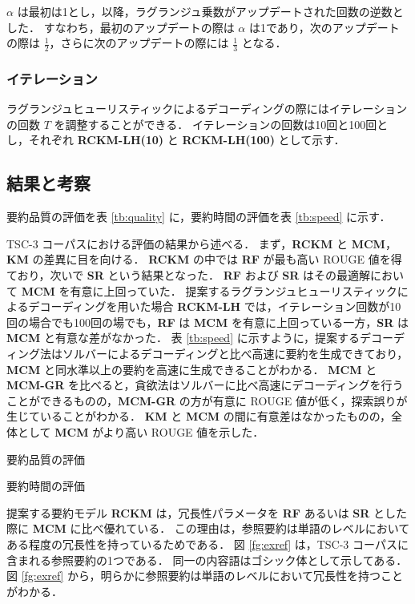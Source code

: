 \documentclass[japanese]{jnlp_1.4}
\begin{document}
$ \alpha $ は最初は1とし，以降，ラグランジュ乗数がアップデートされた回数の逆数とした．
すなわち，最初のアップデートの際は $ \alpha $ は1であり，次のアップデートの際は $ \frac{1}{2}$，さらに次のアップデートの際には $ \frac{1}{3} $ となる．

\subsubsection{イテレーション}

ラグランジュヒューリスティックによるデコーディングの際にはイテレーションの回数 $ T $ を調整することができる．
イテレーションの回数は10回と100回とし，それぞれ {\bf RCKM-LH(10)} と {\bf RCKM-LH(100)} として示す．


\subsection{結果と考察}
\label{results}

要約品質の評価を表 \ref{tb:quality} に，要約時間の評価を表 \ref{tb:speed} に示す．

TSC-3 コーパスにおける評価の結果から述べる．
まず，{\bf RCKM} と {\bf MCM}，{\bf KM} の差異に目を向ける．
{\bf RCKM} の中では {\bf RF} が最も高い ROUGE 値を得ており，次いで {\bf SR} という結果となった．
{\bf RF} および {\bf SR} はその最適解において {\bf MCM} を有意に上回っていた．
提案するラグランジュヒューリスティックによるデコーディングを用いた場合 {\bf RCKM-LH } では，イテレーション回数が10回の場合でも100回の場でも，{\bf RF} は {\bf MCM} を有意に上回っている一方，{\bf SR} は {\bf MCM} と有意な差がなかった．
表 \ref{tb:speed} に示すように，提案するデコーディング法はソルバーによるデコーディングと比べ高速に要約を生成できており，{\bf MCM} と同水準以上の要約を高速に生成できることがわかる．
{\bf MCM} と {\bf MCM-GR} を比べると，貪欲法はソルバーに比べ高速にデコーディングを行うことができるものの，{\bf MCM-GR} の方が有意に ROUGE 値が低く，探索誤りが生じていることがわかる．
{\bf KM} と {\bf MCM} の間に有意差はなかったものの，全体として {\bf MCM } がより高い ROUGE 値を示した．

\begin{table}[p]
\caption{要約品質の評価}
\label{tb:quality}

\end{table}
\begin{table}[p]
\caption{要約時間の評価}
\label{tb:speed}

\end{table}


提案する要約モデル {\bf RCKM} は，冗長性パラメータを {\bf RF} あるいは {\bf SR} とした際に {\bf MCM} に比べ優れている．
この理由は，参照要約は単語のレベルにおいてある程度の冗長性を持っているためである．
図 \ref{fg:exref} は，TSC-3 コーパスに含まれる参照要約の1つである．
同一の内容語はゴシック体として示してある．
図 \ref{fg:exref} から，明らかに参照要約は単語のレベルにおいて冗長性を持つことがわかる．
\end{document}
